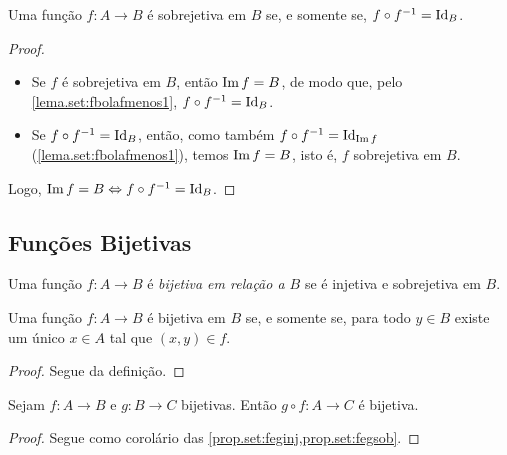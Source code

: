 \begin{theorem} \label{teo.set:sob}
    Uma função $f : A \to B$ é sobrejetiva em $B$ se, e somente se, $f \circ f^{-1} = \operatorname{Id}_B$.
\end{theorem}

\begin{proof}
    \leavevmode
        \begin{itemize}[align=left]
            \item[($\Rightarrow$)] Se $f$ é sobrejetiva em $B$, então $\operatorname{Im} f = B$, de modo que, pelo \cref{lema.set:fbolafmenos1}, $f \circ f^{-1} = \operatorname{Id}_B$.
            \item[($\Leftarrow$)] Se $f \circ f^{-1} = \operatorname{Id}_B$, então, como também $f \circ f^{-1} = \operatorname{Id}_{\operatorname{Im} f}$ (\cref{lema.set:fbolafmenos1}), temos $\operatorname{Im} f = B$, isto é, $f$ sobrejetiva em $B$.
        \end{itemize}
    Logo, $\operatorname{Im} f = B \Leftrightarrow f \circ f^{-1} = \operatorname{Id}_B$. \blackproof
\end{proof}

\subsection{Funções Bijetivas}

\begin{definition}
    Uma função $f: A \to B$ é \emph{bijetiva em relação a $B$} se é injetiva e sobrejetiva em $B$.
\end{definition}

\begin{proposition} \label{prop.set:defbij}
    Uma função $f: A \to B$ é bijetiva em $B$ se, e somente se, para todo $y \in B$ existe um único $x \in A$ tal que $(x,y) \in f$.
\end{proposition}

\begin{proof}
    Segue da definição. \blackproof
\end{proof}

\begin{proposition}
    Sejam $f : A \to B$ e $g : B \to C$ bijetivas. Então $g \circ f : A \to C$ é bijetiva.
\end{proposition}

\begin{proof}
    Segue como corolário das \cref{prop.set:feginj,prop.set:fegsob}. \blackproof
\end{proof}

